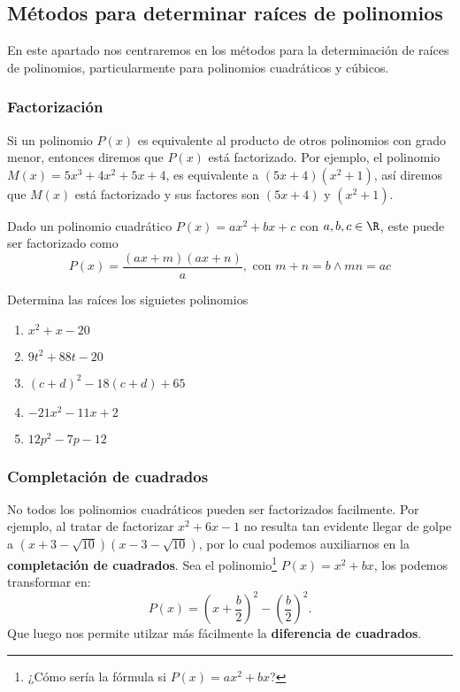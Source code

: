 \subsection{Métodos para determinar raíces de polinomios}
{
    En este apartado nos centraremos en los métodos para la determinación de raíces de polinomios, particularmente para polinomios cuadráticos y cúbicos.

    \subsubsection{Factorización}
    {
        Si un polinomio $P(x)$ es equivalente al producto de otros polinomios con grado menor, entonces diremos que $P(x)$ está factorizado. Por ejemplo, el polinomio $M(x) = 5x^3 + 4x^2 + 5x + 4$, es equivalente a $(5x+4)(x^2 + 1)$, así diremos que $M(x)$ está factorizado y sus factores son $(5x+4) \mbox{ y } (x^2 + 1)$.

        \begin{section-definition}
            Dado un polinomio cuadrático $P(x) = ax^2 + bx + c$ con $a, b, c \in \R$, este puede ser factorizado como
            \[ P(x) = \frac{(ax+m)(ax+n)}{a}, \mbox{ con } m + n = b \land mn = ac\]
        \end{section-definition}

        \begin{exercise}
            Determina las raíces los siguietes polinomios
            \begin{multicols}{3}
                \begin{enumerate}
                    \item $x^2 + x - 20$
                    \item $9t^2 + 88t - 20$
                    \item $(c + d)^2 - 18(c + d) + 65$
                    \item $-21x^2 - 11x + 2$
                    \item $12p^2 - 7p - 12$
                \end{enumerate}
            \end{multicols}
        \end{exercise}
    }\label{factorization}

    \subsubsection{Completación de cuadrados}
    {
        No todos los polinomios cuadráticos pueden ser factorizados facilmente. Por ejemplo, al tratar de factorizar $x^2 + 6x - 1$ no resulta tan evidente llegar de golpe a $(x + 3 - \sqrt {10})(x-3-\sqrt {10})$, por lo cual podemos auxiliarnos en la \textbf{completación de cuadrados}.
        Sea el polinomio\footnote{¿Cómo sería la fórmula si $P(x) = ax^2 + bx$?} $P(x) = x^2 + bx$, los podemos transformar en:
        \[P(x) = \left( x + \frac{b}{2} \right)^2 - \left( \frac{b}{2} \right)^2.\]
        Que luego nos permite utilzar más fácilmente la \textbf{diferencia de cuadrados}.

}}
